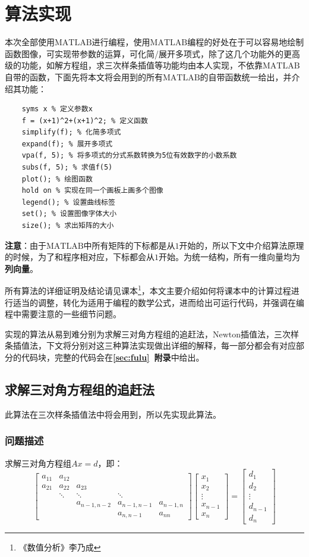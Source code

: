 \documentclass[12pt, a4paper, oneside]{ctexart}
\begin{document}
\section{算法实现}
本次全部使用$\text{MATLAB}$进行编程，使用$\text{MATLAB}$编程的好处在于可以容易地绘制函数图像，可实现带参数的运算，可化简/展开多项式，除了这几个功能外的更高级的功能，如解方程组，求三次样条插值等功能均由本人实现，不依靠$\text{MATLAB}$自带的函数，下面先将本文将会用到的所有$\text{MATLAB}$的自带函数统一给出，并介绍其功能：
\begin{lstlisting}
    syms x % 定义参数x
    f = (x+1)^2+(x+1)^2; % 定义函数
    simplify(f); % 化简多项式
    expand(f); % 展开多项式
    vpa(f, 5); % 将多项式的分式系数转换为5位有效数字的小数系数
    subs(f, 5); % 求值f(5)
    plot(); % 绘图函数
    hold on % 实现在同一个画板上画多个图像
    legend(); % 设置曲线标签
    set(); % 设置图像字体大小
    size(); % 求出矩阵的大小
\end{lstlisting}
\textbf{注意}：由于$\text{MATLAB}$中所有矩阵的下标都是从$1$开始的，所以下文中介绍算法原理的时候，为了和程序相对应，下标都会从$1$开始。为统一结构，所有一维向量均为\textbf{列向量}。

所有算法的详细证明及结论请见课本\footnote{《数值分析》李乃成}，本文主要介绍如何将课本中的计算过程进行适当的调整，转化为适用于编程的数学公式，进而给出可运行代码，并强调在编程中需要注意的一些细节问题。

实现的算法从易到难分别为求解三对角方程组的追赶法，$\text{Newton}$插值法，三次样条插值法，下文将分别对这三种算法实现做出详细的解释，每一部分都会有对应部分的代码块，完整的代码会在\textbf{\ref{sec:fulu}\ 附录}中给出。
\subsection{求解三对角方程组的追赶法}\label{subsec:chase}
此算法在三次样条插值法中将会用到，所以先实现此算法。
\subsubsection{问题描述}
求解三对角方程组$Ax=d$，即：
\begin{equation*}
    \left[\begin{matrix}
        a_{11}&a_{12}& & & \\
        a_{21}&a_{22}&a_{23}& & \\
        & \ddots &\ddots&\ddots& \\
        & & a_{n-1,n-2} & a_{n-1,n-1} & a_{n-1,n}\\
        & & & a_{n, n-1}& a_{nn}
    \end{matrix}\right]\left[\begin{matrix}
        x_1\\x_2\\ \vdots\\x_{n-1}\\x_n
    \end{matrix}\right]=\left[\begin{matrix}
        d_1\\d_2\\ \vdots\\ d_{n-1}\\ d_n
    \end{matrix}\right]
\end{equation*}
\end{document}
